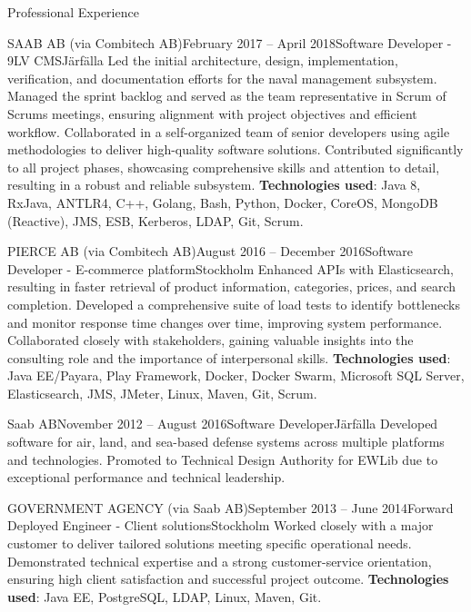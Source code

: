 \documentclass{resume}
\begin{document}
\begin{rSection}{Professional Experience}
\begin{rSubsection}{SAAB AB (via Combitech AB)}{February 2017 -- April 2018}{Software Developer - 9LV CMS}{Järfälla}
\bItem Led the initial architecture, design, implementation, verification, and documentation efforts for the naval management subsystem.
\bItem Managed the sprint backlog and served as the team representative in Scrum of Scrums meetings, ensuring alignment with project objectives and efficient workflow.
\bItem Collaborated in a self-organized team of senior developers using agile methodologies to deliver high-quality software solutions.
\bItem Contributed significantly to all project phases, showcasing comprehensive skills and attention to detail, resulting in a robust and reliable subsystem.
\bItem \textbf{Technologies used}: Java 8, RxJava, ANTLR4, C++, Golang, Bash, Python, Docker, CoreOS, MongoDB (Reactive), JMS, ESB, Kerberos, LDAP, Git, Scrum.
\end{rSubsection}

\begin{rSubsection}{PIERCE AB (via Combitech AB)}{August 2016 -- December 2016}{Software Developer - E-commerce platform}{Stockholm}
\bItem Enhanced APIs with Elasticsearch, resulting in faster retrieval of product information, categories, prices, and search completion.
\bItem Developed a comprehensive suite of load tests to identify bottlenecks and monitor response time changes over time, improving system performance.
\bItem Collaborated closely with stakeholders, gaining valuable insights into the consulting role and the importance of interpersonal skills.
\bItem \textbf{Technologies used}: Java EE/Payara, Play Framework, Docker, Docker Swarm, Microsoft SQL Server, Elasticsearch, JMS, JMeter, Linux, Maven, Git, Scrum.
\end{rSubsection}

\begin{rSubsection}{Saab AB}{November 2012 -- August 2016}{Software Developer}{Järfälla}
\bItem Developed software for air, land, and sea-based defense systems across multiple platforms and technologies.
\bItem Promoted to Technical Design Authority for EWLib due to exceptional performance and technical leadership.
\end{rSubsection}

\begin{rSubsection}{GOVERNMENT AGENCY (via Saab AB)}{September 2013 -- June 2014}{Forward Deployed Engineer - Client solutions}{Stockholm} %
\bItem Worked closely with a major customer to deliver tailored solutions meeting specific operational needs.
\bItem Demonstrated technical expertise and a strong customer-service orientation, ensuring high client satisfaction and successful project outcome.
\bItem \textbf{Technologies used}: Java EE, PostgreSQL, LDAP, Linux, Maven, Git.
\end{rSubsection}


\end{rSection}
\end{document}
